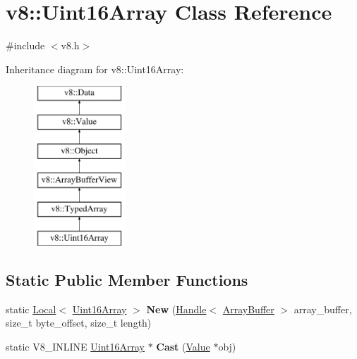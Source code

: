 \hypertarget{classv8_1_1Uint16Array}{\section{v8\-:\-:Uint16\-Array Class Reference}
\label{classv8_1_1Uint16Array}
}


{\ttfamily \#include $<$v8.\-h$>$}

Inheritance diagram for v8\-:\-:Uint16\-Array\-:\begin{figure}[H]
\begin{center}
\leavevmode
\includegraphics[height=6.000000cm]{classv8_1_1Uint16Array}
\end{center}
\end{figure}
\subsection*{Static Public Member Functions}
\begin{DoxyCompactItemize}
\item 
\hypertarget{classv8_1_1Uint16Array_a61009e1e8ee6903da33cb95685910270}{static \hyperlink{classv8_1_1Local}{Local}$<$ \hyperlink{classv8_1_1Uint16Array}{Uint16\-Array} $>$ {\bfseries New} (\hyperlink{classv8_1_1Handle}{Handle}$<$ \hyperlink{classv8_1_1ArrayBuffer}{Array\-Buffer} $>$ array\-\_\-buffer, size\-\_\-t byte\-\_\-offset, size\-\_\-t length)}\label{classv8_1_1Uint16Array_a61009e1e8ee6903da33cb95685910270}

\item 
\hypertarget{classv8_1_1Uint16Array_a84b017960621903a00ef2d912233ce34}{static V8\-\_\-\-I\-N\-L\-I\-N\-E \hyperlink{classv8_1_1Uint16Array}{Uint16\-Array} $\ast$ {\bfseries Cast} (\hyperlink{classv8_1_1Value}{Value} $\ast$obj)}\label{classv8_1_1Uint16Array_a84b017960621903a00ef2d912233ce34}

\end{DoxyCompactItemize}
